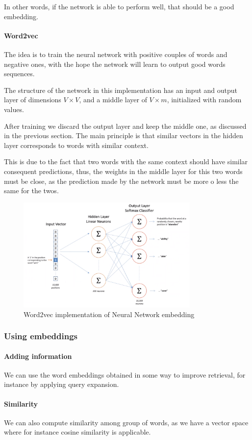 In other words, if the network is able to perform well, that should 
be a good embedding.

\paragraph{Word2vec}
The idea is to train the neural network with positive couples of 
words and negative ones, with the hope the network will learn 
to output good words sequences.

The structure of the network in this implementation 
has an input and output layer of dimensions $V \times V$, 
and a middle layer of $V \times m$, initialized with random values.

After training we discard the output layer and keep the 
middle one, as discussed in the previous section.
The main principle is that similar vectors in the hidden 
layer corresponds to words with similar context. 

This is due to the fact that two words with the same context
should have similar consequent predictions, thus, the weights in 
the middle layer for this two words must be close, as the 
prediction made by the network must be more o less the same for 
the twos.

\begin{figure}[h]
    \centering
    \includegraphics[width=0.8\textwidth]{images/nn-words.png}
    \caption{Word2vec implementation of Neural Network embedding}
\end{figure}

\subsubsection{Using embeddings}

\paragraph{Adding information}
We can use the word embeddings obtained in some way to improve 
retrieval, for instance by applying query expansion.

\paragraph{Similarity}
We can also compute similarity among group of words, 
as we have a vector space where for instance cosine similarity is 
applicable.